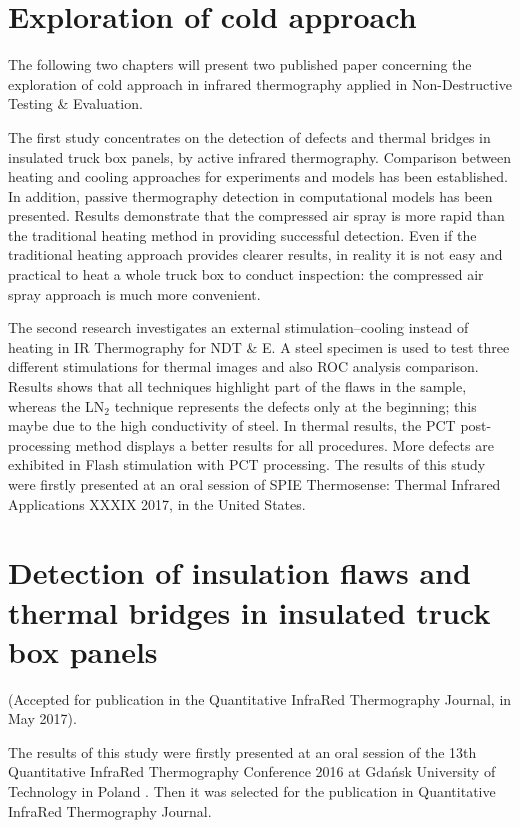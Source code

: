 \chapter*{Exploration of cold approach}     %
The following two chapters will present two published paper concerning the exploration of cold approach in infrared thermography applied in Non-Destructive Testing \& Evaluation.

The first study concentrates on the detection of defects and thermal bridges in insulated truck box panels, by active infrared thermography. Comparison between heating and cooling approaches for experiments and models has been established. In addition, passive thermography detection in computational models has been presented. Results demonstrate that the compressed air spray is more rapid than the traditional heating method in providing successful detection. Even if the traditional heating approach provides clearer results, in reality it is not easy and practical to heat a whole truck box to conduct inspection: the compressed air spray approach is much more convenient.

The second research investigates an external stimulation–cooling instead of heating in IR Thermography for NDT \& E. A steel specimen is used to test three different stimulations for thermal images and also ROC analysis comparison. Results shows that all techniques highlight part of the flaws in the sample, whereas the LN$_2$ technique represents the defects only at the beginning; this maybe due to the high conductivity of steel. In thermal results, the PCT post-processing method displays a better results for all procedures. More defects are exhibited in Flash stimulation with PCT processing.  The results of this study were firstly presented at an oral session of SPIE Thermosense: Thermal Infrared Applications XXXIX 2017, in the United States.

\chapter{Detection of insulation flaws and thermal bridges in insulated truck box panels}
(Accepted for publication in the Quantitative InfraRed Thermography Journal, in May 2017).

%

The results of this study were firstly presented at an oral session of the 13th Quantitative InfraRed Thermography Conference 2016 at Gdańsk University of Technology in Poland . Then it was selected for the publication in Quantitative InfraRed Thermography Journal.

